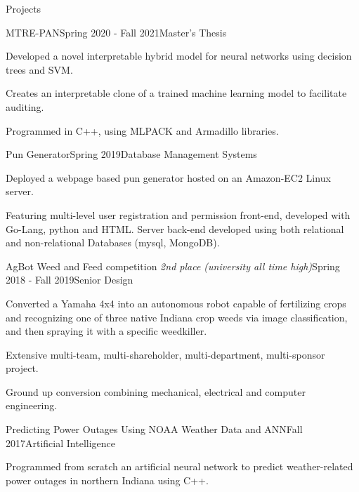 \documentclass{resume}
\begin{document}
% 
% 
\begin{rSection}{Projects}

\begin{rSubsection}{MTRE-PAN}{Spring 2020 - Fall 2021}{{Master's Thesis}}{}
    \item Developed a novel interpretable hybrid model for neural networks using decision trees and SVM.
    \item Creates an interpretable clone of a trained machine learning model to facilitate auditing.
    \item Programmed in C++, using MLPACK and Armadillo libraries.
\end{rSubsection}


\begin{rSubsection}{Pun Generator}{Spring 2019}{{Database Management Systems}}{}
    \item Deployed a webpage based pun generator hosted on an Amazon-EC2 Linux server.
    \item Featuring multi-level user registration and permission front-end, developed with Go-Lang, python and HTML. Server back-end developed using both relational and non-relational Databases (mysql, MongoDB).
\end{rSubsection}

\begin{rSubsection}{AgBot Weed and Feed competition \emph{2nd place (university all time high)}}{Spring 2018 - Fall 2019}{{Senior Design}}{}
    \item Converted a Yamaha 4x4 into an autonomous robot capable of fertilizing crops and recognizing one of three native Indiana crop weeds via image classification, and then spraying it with a specific weedkiller.
    \item Extensive multi-team, multi-shareholder, multi-department, multi-sponsor project.
    \item Ground up conversion combining mechanical, electrical and computer engineering.
\end{rSubsection}

\begin{rSubsection}{Predicting Power Outages Using NOAA Weather Data and ANN}{Fall 2017}{{Artificial Intelligence}}{}
    \item Programmed from scratch an artificial neural network to predict weather-related power outages in northern Indiana using C++.
\end{rSubsection}

\end{rSection}
\end{document}
